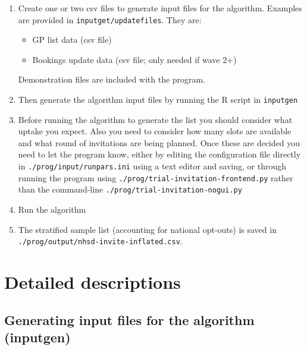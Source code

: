 \documentclass[a4paper]{article}
\begin{document}
\begin{enumerate}
	\item Create  one or two csv files to generate input files for the algorithm. Examples are provided in \texttt{inputget/updatefiles}. They are:
	\begin{itemize}
		\item GP list data (csv file)
		\item Bookings update data (csv file; only needed if wave 2+)
	\end{itemize}
		Demonstration files are included with the program.
\item Then generate the algorithm input files by running the R script in \texttt{inputgen} 
		\item Before running the algorithm to generate the list you should consider what uptake you expect. Also you need to consider how many slots are available and what round of invitations are being planned. Once these are decided you need to let the program know, either by editing the configuration file directly in \texttt{./prog/input/runpars.ini} using a text editor and saving, or through running the program using \texttt{./prog/trial-invitation-frontend.py} rather than the command-line \texttt{./prog/trial-invitation-nogui.py} 
	\item Run the algorithm
	\item The stratified sample list (accounting for national opt-outs) is saved in \texttt{./prog/output/nhsd-invite-inflated.csv}. 
\end{enumerate}

\section{Detailed descriptions}

\subsection{Generating input files for the algorithm (inputgen)}
\end{document}
